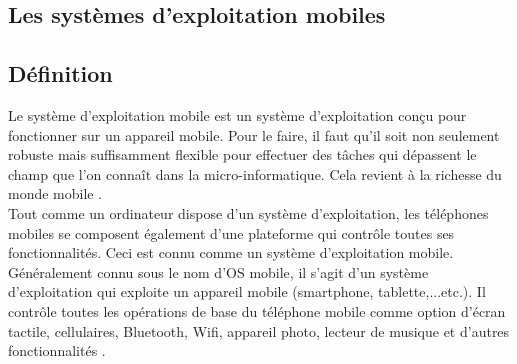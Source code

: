 \documentclass[french,a4,12pt]{report}
\begin{document}
\newpage
\begin{tcolorbox}[leftrule=3mm]

\section{Les systèmes d'exploitation mobiles }
\end{tcolorbox}
\begin{tcolorbox}[colframe=green!75,rightrule=0.5cm,leftrule=0.5cm,]
	\subsection{  Définition }
\end{tcolorbox}
\textsf{Le système d'exploitation mobile est un système d'exploitation conçu pour fonctionner sur un appareil mobile. Pour le faire, il faut qu'il soit non seulement robuste mais suffisamment flexible pour effectuer des tâches qui dépassent le champ que l'on connaît dans la micro-informatique. Cela revient à la richesse du monde mobile \cite{4}.} \\ 

\textsf{Tout comme un ordinateur dispose d'un système d'exploitation, les téléphones mobiles se composent également d'une plateforme qui contrôle toutes ses fonctionnalités. Ceci est connu comme un système d'exploitation mobile. Généralement connu sous le nom d'OS mobile, il s'agit d'un système d'exploitation qui exploite un appareil mobile (smartphone, tablette,...etc.). Il contrôle toutes les opérations de base du téléphone mobile comme option d'écran tactile, cellulaires, Bluetooth, Wifi, appareil photo, lecteur de musique et d'autres fonctionnalités \cite{5}.}\\%
\end{document}

